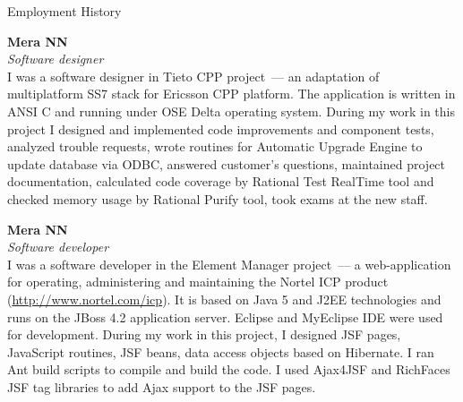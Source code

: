 \begin{rubric}{Employment History}
  \parbox{\EmpHistoryBlock}{
  \textbf{Mera NN}\\
  \textit{Software designer}\\
  I was a software designer in Tieto CPP project~--- an adaptation of
  multiplatform SS7 stack for Ericsson CPP platform. The application
  is written in ANSI C and running under OSE Delta operating
  system. During my work in this project I designed and implemented
  code improvements and component tests, analyzed trouble requests,
  wrote routines for Automatic Upgrade Engine to update database via
  ODBC, answered customer's questions, maintained project
  documentation, calculated code coverage by Rational Test RealTime
  tool and checked memory usage by Rational Purify tool, took exams
  at the new staff.
  }

  \parbox{\EmpHistoryBlock}{
  \textbf{Mera NN}\\
  \textit{Software developer}\\
   I was a software developer in the Element Manager project~--- a
   web-application for operating, administering and maintaining the
   Nortel ICP product (\url{http://www.nortel.com/icp}). It is based on
   Java 5 and J2EE technologies and runs on the JBoss 4.2 application
   server. Eclipse and MyEclipse IDE were used for
   development. During my work in this project, I designed JSF pages,
   JavaScript routines, JSF beans, data access objects based on
   Hibernate. I ran Ant build scripts to compile and build the code. I
   used Ajax4JSF and RichFaces JSF tag libraries to add Ajax support
   to the JSF pages.
  }
\end{rubric}
